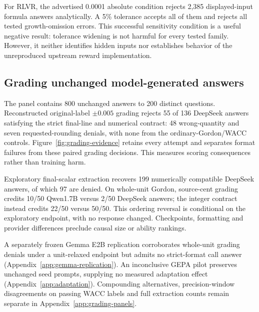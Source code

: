 For RLVR, the advertised 0.0001 absolute condition rejects 2,385 displayed-input formula answers analytically. A 5\% tolerance accepts all of them and rejects all tested growth-omission errors. This successful
sensitivity condition is a useful negative result: tolerance widening is not harmful for every tested family. However, it neither identifies hidden inputs nor establishes behavior of the unreproduced upstream
reward implementation.

\subsection{Grading unchanged model-generated answers}
The panel contains 800 unchanged answers to 200 distinct questions. Reconstructed original-label $\pm0.005$ grading rejects 55 of 136 DeepSeek answers satisfying the strict final-line and numerical contract: 48 wrong-quantity and seven requested-rounding denials, with none from the ordinary-Gordon/WACC controls. Figure~\ref{fig:grading-evidence} retains every attempt and separates format failures from these paired grading decisions. This measures scoring consequences rather than training harm.

Exploratory final-scalar extraction recovers 199 numerically compatible DeepSeek answers, of which 97 are denied. On whole-unit Gordon, source-cent grading credits 10/50 Qwen1.7B versus 2/50 DeepSeek answers; the integer contract instead credits 22/50 versus 50/50. This ordering reversal is conditional on the exploratory endpoint, with no response changed. Checkpoints, formatting and provider differences preclude causal size or ability rankings.

A separately frozen Gemma E2B replication corroborates whole-unit grading denials under a unit-relaxed endpoint but admits no strict-format call answer (Appendix~\ref{app:gemma-replication}). An inconclusive GEPA pilot preserves unchanged seed prompts, supplying no measured adaptation effect (Appendix~\ref{app:adaptation}). Compounding alternatives, precision-window disagreements on passing WACC labels and full extraction counts remain separate in Appendix~\ref{app:grading-panels}.

